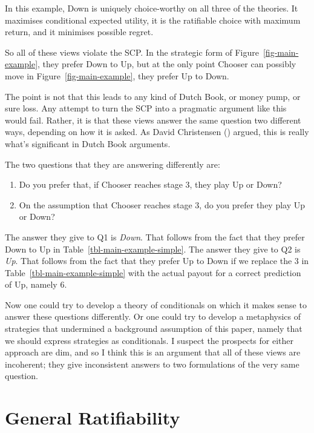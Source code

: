 \documentclass[
  10pt,
  letterpaper,
  DIV=11,
  numbers=noendperiod,
  twoside]{scrartcl}
\providecommand{\tightlist}{%
  \setlength{\itemsep}{0pt}\setlength{\parskip}{0pt}}\usepackage{longtable,booktabs,array}
\begin{document}
In this example, Down is uniquely choice-worthy on all three of the
theories. It maximises conditional expected utility, it is the
ratifiable choice with maximum return, and it minimises possible regret.

So all of these views violate the SCP. In the strategic form of
Figure~\ref{fig-main-example}, they prefer Down to Up, but at the only
point Chooser can possibly move in Figure~\ref{fig-main-example}, they
prefer Up to Down.

The point is not that this leads to any kind of Dutch Book, or money
pump, or sure loss. Any attempt to turn the SCP into a pragmatic
argument like this would fail. Rather, it is that these views answer the
same question two different ways, depending on how it is asked. As David
Christensen () argued, this is
really what's significant in Dutch Book arguments.

The two questions that they are answering differently are:

\begin{enumerate}
\def\labelenumi{\arabic{enumi}.}
\tightlist
\item
  Do you prefer that, if Chooser reaches stage 3, they play Up or Down?
\item
  On the assumption that Chooser reaches stage 3, do you prefer they
  play Up or Down?
\end{enumerate}

The answer they give to Q1 is \emph{Down}. That follows from the fact
that they prefer Down to Up in Table~\ref{tbl-main-example-simple}. The
answer they give to Q2 is \emph{Up}. That follows from the fact that
they prefer Up to Down if we replace the 3 in
Table~\ref{tbl-main-example-simple} with the actual payout for a correct
prediction of Up, namely 6.

Now one could try to develop a theory of conditionals on which it makes
sense to answer these questions differently. Or one could try to develop
a metaphysics of strategies that undermined a background assumption of
this paper, namely that we should express strategies as conditionals. I
suspect the prospects for either approach are dim, and so I think this
is an argument that all of these views are incoherent; they give
inconsistent answers to two formulations of the very same question.

\section{General Ratifiability}\label{sec-general-ratify}
\end{document}
